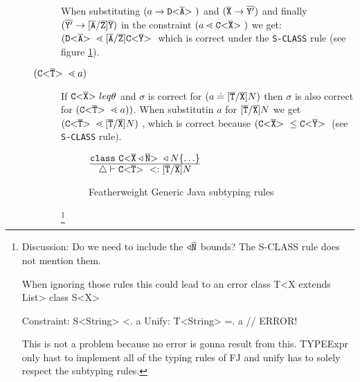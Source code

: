 \documentclass[runningheads]{llncs}
\begin{document}
\begin{description}
\begin{description}
When substituting $(a \to \mathtt{D {\tt <} \overline{\tt A} {\tt >} \ })$ and $(\overline{\tt X} \to \overline{\tt Y'})$
and finally $ (\overline{\tt Y'} \to [\overline{\tt A}/\overline{\tt Z}]\overline{\tt Y})$ in the constraint $(a \lessdot \mathtt{C {\tt <} \overline{\tt X} {\tt >} \ })$
we get: $(\mathtt{D {\tt <} \overline{\tt A} {\tt >} \ } \lessdot [\overline{\tt A}/\overline{\tt Z}]\mathtt{C {\tt <} \overline{\tt Y} {\tt >} \ }$
which is correct under the \texttt{S-CLASS} rule (see figure \ref{fig:gfj-subtyping-rules}).

\item[$(\mathtt{C {\tt <} \overline{\tt T} {\tt >} \ } \lessdot a)$] If $\mathtt{C {\tt <} \overline{\tt X} {\tt >} \ } leq \theta$ and $\sigma$ is correct for $(a \doteq [\overline{\tt T}/\overline{\tt X}]N)$
then $\sigma$ is also correct for $(\mathtt{C {\tt <} \overline{\tt T} {\tt >} \ } \lessdot a))$.
When substitutin $a$ for $[\overline{\tt T}/\overline{\tt X}]N$ we get 
$(\mathtt{C {\tt <} \overline{\tt T} {\tt >} \ } \lessdot [\overline{\tt T}/\overline{\tt X}]N)$
, which is correct because $(\mathtt{C {\tt <} \overline{\tt X} {\tt >} \ } \leq \mathtt{C {\tt <} \overline{\tt Y} {\tt >} \ }$
(see \texttt{S-CLASS} rule).

\begin{figure}
$\frac{\displaystyle 
  \texttt{class}\ \mathtt{C {\tt <} \overline{\tt X} \triangleleft \overline{\tt N} {\tt >} \ } \triangleleft N \{  \ldots  \}
}{\displaystyle 
  \triangle \vdash \mathtt{C {\tt <} \overline{\tt T} {\tt >} \ } <: [\overline{\tt T}/\overline{\tt X}]N
}$ 
\caption{Featherweight Generic Java subtyping rules}\label{fig:gfj-subtyping-rules}
\end{figure}

\footnote{
Discussion:
Do we need to include the $\triangleleft \overline{\tt N}$ bounds?
The S-CLASS rule does not mention them.

When ignoring those rules this could lead to an error
class T<X extends List> {
}
class S<X>{}

Constraint: S<String> <. a
Unify: T<String> =. a // ERROR!

This is not a problem because no error is gonna result from this.
TYPEExpr only hast to implement all of the typing rules of FJ
and unify has to solely respect the subtyping rules.

}
\end{description}


\end{description}
\end{document}
